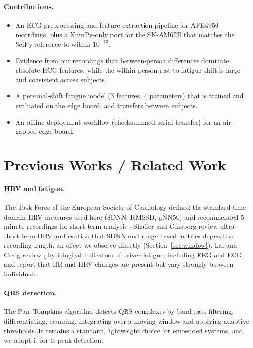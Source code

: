 \documentclass[11pt]{article}
\begin{document}
\paragraph{Contributions.}
\begin{itemize}
  \item An ECG preprocessing and feature-extraction pipeline for AFE4950 recordings, plus a NumPy-only port
  for the SK-AM62B that matches the SciPy reference to within $10^{-13}$.
  \item Evidence from our recordings that between-person differences dominate absolute ECG features,
  while the within-person rest-to-fatigue shift is large and consistent across subjects.
  \item A personal-shift fatigue model (3 features, 4 parameters) that is trained and evaluated
  on the edge board, and transfers between subjects.
  \item An offline deployment workflow (checksummed serial transfer) for an air-gapped edge board.
\end{itemize}

\section{Previous Works / Related Work}

\paragraph{HRV and fatigue.}
The Task Force of the European Society of Cardiology defined the standard time-domain HRV measures used
here (SDNN, RMSSD, pNN50) and recommended 5-minute recordings for short-term analysis
\cite{taskforce1996}. Shaffer and Ginsberg \cite{shaffer2017} review ultra-short-term HRV and caution that
SDNN and range-based metrics depend on recording length, an effect we observe directly
(Section~\ref{sec:window}). Lal and Craig \cite{lal2001} review physiological indicators of driver fatigue,
including EEG and ECG, and report that HR and HRV changes are present but vary strongly between individuals.

\paragraph{QRS detection.}
The Pan--Tompkins algorithm \cite{pantompkins1985} detects QRS complexes by band-pass filtering,
differentiating, squaring, integrating over a moving window and applying adaptive thresholds. It remains
a standard, lightweight choice for embedded systems, and we adopt it for R-peak detection.
\end{document}
